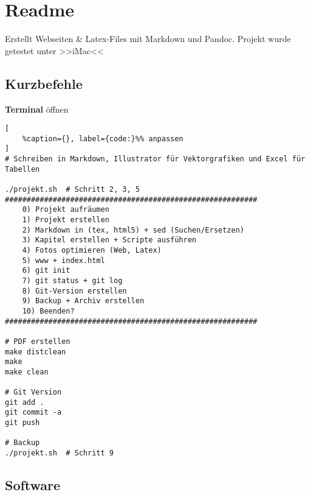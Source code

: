 \section{Readme}\label{readme}

Erstellt Webseiten \& Latex-Files mit Markdown und Pandoc. Projekt wurde
getestet unter >>iMac<<

\subsection{Kurzbefehle}\label{kurzbefehle}

\textbf{Terminal} öffnen

\lstset{language=Python}%
\begin{lstlisting}[
	%caption={}, label={code:}%% anpassen
]
# Schreiben in Markdown, Illustrator für Vektorgrafiken und Excel für Tabellen

./projekt.sh  # Schritt 2, 3, 5
##########################################################
    0) Projekt aufräumen
    1) Projekt erstellen
    2) Markdown in (tex, html5) + sed (Suchen/Ersetzen)
    3) Kapitel erstellen + Scripte ausführen
    4) Fotos optimieren (Web, Latex)
    5) www + index.html
    6) git init
    7) git status + git log
    8) Git-Version erstellen
    9) Backup + Archiv erstellen
    10) Beenden?
##########################################################

# PDF erstellen
make distclean
make
make clean

# Git Version
git add .
git commit -a
git push

# Backup
./projekt.sh  # Schritt 9
\end{lstlisting}

\subsection{Software}\label{software}

